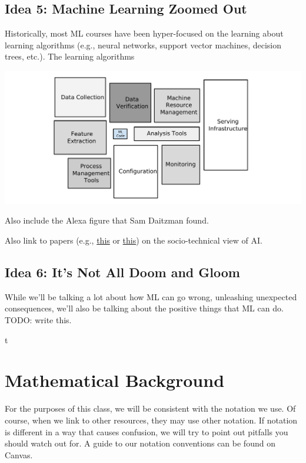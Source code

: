 \documentclass[assignment01_Solutions]{subfiles}
\begin{document}
\subsection*{Idea 5: Machine Learning Zoomed Out}

Historically, most ML courses have been hyper-focused on the learning about learning algorithms (e.g., neural networks, support vector machines, decision trees, etc.).  The learning algorithms 

\begin{center}
\includegraphics[width=.6\linewidth]{figures/MlSystem}
\end{center}

Also include the Alexa figure that Sam Daitzman found.

Also link to papers (e.g., \href{https://link.springer.com/article/10.1007/s11023-017-9417-6}{this} or \href{https://dl.acm.org/citation.cfm?id=3287598}{this}) on the socio-technical view of AI.


\subsection*{Idea 6: It's Not All Doom and Gloom}
While we'll be talking a lot about how ML can go wrong, unleashing unexpected consequences, we'll also be talking about the positive things that ML can do.  TODO: write this.


\begin{exercise}
t
\end{exercise}

\section{Mathematical Background}


\begin{notice}
For the purposes of this class, we will be consistent with the notation we use.  Of course, when we link to other resources, they may use other notation.  If notation is different in a way that causes confusion, we will try to point out pitfalls you should watch out for.  A guide to our notation conventions can be found on Canvas.
\end{notice}
\end{document}
